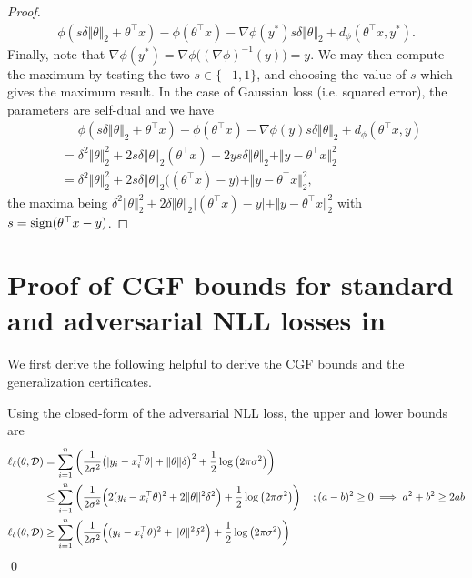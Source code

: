 \begin{proof}
\begin{align*}
    \phi(s \delta \Vert \theta \Vert_2 + \theta^\top x) - \phi(\theta^\top x) - \nabla \phi(y^\ast) s \delta \Vert \theta \Vert_2 + d_\phi(\theta^\top x, y^\ast).
\end{align*}
Finally, note that $\nabla \phi(y^\ast) = \nabla \phi\big( (\nabla \phi)^{-1}(y)\big)=y$.
We may then compute the maximum by testing the two $s \in \{ -1, 1\}$, and choosing the value of $s$ which gives the maximum result.
In the case of Gaussian loss (i.e. squared error), the parameters are self-dual and we have
\begin{align*}
    &\phantom{{}={}} \phi(s \delta \Vert \theta \Vert_2 + \theta^\top x) - \phi(\theta^\top x) - \nabla \phi(y) s \delta \Vert \theta \Vert_2 + d_\phi(\theta^\top x, y) \\
    &=\delta^2 \Vert \theta \Vert_2^2 + 2 s \delta \Vert \theta \Vert_2 (\theta^\top x) - 2 y s \delta \Vert \theta \Vert_2 + \Vert y - \theta^\top x \Vert_2^2 \\
    &= \delta^2 \Vert \theta \Vert_2^2 + 2 s \delta \Vert \theta \Vert_2  \big( (\theta^\top x) -  y  \big) + \Vert y - \theta^\top x \Vert_2^2,
\end{align*}
the maxima being $\delta^2 \Vert \theta \Vert_2^2 + 2  \delta \Vert \theta \Vert_2  \big| (\theta^\top x) -  y  \big| + \Vert y - \theta^\top x \Vert_2^2$ with $s = \operatorname{sign} (\theta^\top x - y)$.
\end{proof}

\clearpage

\section{Proof of CGF bounds for standard and adversarial NLL losses in \MakeLowercase{}}
\label{app:cgf_std_adv_loss}

We first derive the following helpful  to derive the CGF bounds and the generalization certificates.

\begin{lemma}
\label{lm:adv_loss_bounds} 
Using the closed-form of the adversarial NLL loss, the upper and lower bounds are
\begin{align*}
     \ell_\delta(\theta, \mathcal{D}) &= \sum_{i=1}^n \left(  \frac{1}{2\sigma^2}\big(|y_i - x_i^\top \theta| + \Vert \theta \Vert \delta\big)^2 + \frac{1}{2} \log \left( 2\pi \sigma^2\right) \right) \\
    &\leq \sum_{i=1}^n \left( \frac{1}{2\sigma^2} \Big( 2(y_i - x_i^\top \theta)^2 + 2\Vert \theta \Vert^2 \delta^2 \Big) + \frac{1}{2} \log \left( 2\pi \sigma^2\right) \right) \quad ; (a-b)^2 \geq 0 \implies a^2+b^2 \geq 2ab \\
     \ell_\delta(\theta, \mathcal{D}) &\geq \sum_{i=1}^n \left(  \frac{1}{2\sigma^2} \Big( (y_i - x_i^\top \theta)^2 + \Vert \theta \Vert^2 \delta^2 \Big) + \frac{1}{2} \log \left( 2\pi \sigma^2\right) \right)
\end{align*}
\qed
\end{lemma}

